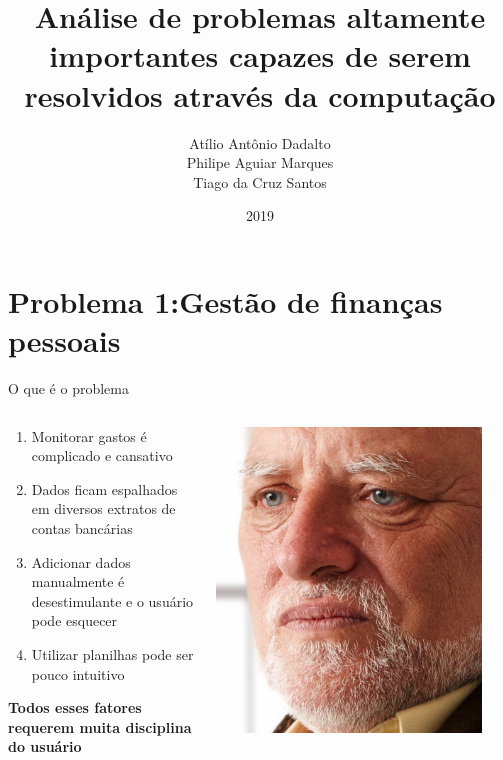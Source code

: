 \documentclass[12pt]{beamer}
\title{Análise de problemas altamente importantes capazes de serem resolvidos através da computação}
\author{Atílio Antônio Dadalto\\Philipe Aguiar Marques\\Tiago da Cruz Santos}
\date{2019}
\institute{UFES}
\def\newline{}%
\begin{document}
\maketitle

\section{Problema 1:\newline Gestão de finanças pessoais}

\begin{frame}{O que é o problema}
    \begin{columns}
        \begin{column}{0.65\textwidth}
            \begin{enumerate}[label=•]
                \item Monitorar gastos é complicado e cansativo
        	    \item Dados ficam espalhados em diversos extratos de contas bancárias
        	    \item Adicionar dados manualmente é desestimulante e o usuário pode esquecer
        	    \item Utilizar planilhas pode ser pouco intuitivo
            \end{enumerate}
            \vspace{2mm}
            \textbf{Todos esses fatores requerem muita disciplina do usuário}
        \end{column}
        \begin{column}{0.35\textwidth}
            \begin{center}
                \includegraphics[width=0.9\textwidth]{figuras/haroldtriste.jpg}
             \end{center}
        \end{column}
    \end{columns}
\end{frame}
\end{document}
